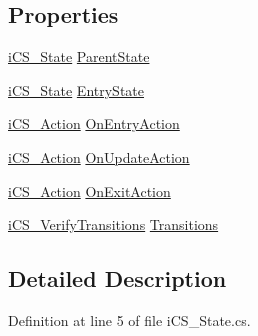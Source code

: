 \subsection*{Properties}
\begin{DoxyCompactItemize}
\item 
\hyperlink{classi_c_s___state}{i\+C\+S\+\_\+\+State} \hyperlink{classi_c_s___state_a1e84880a51a962cc0bf11aa9edc6b720}{Parent\+State}
\item 
\hyperlink{classi_c_s___state}{i\+C\+S\+\_\+\+State} \hyperlink{classi_c_s___state_a7954d179eadef63d55e73a1713840297}{Entry\+State}
\item 
\hyperlink{classi_c_s___action}{i\+C\+S\+\_\+\+Action} \hyperlink{classi_c_s___state_aacb78c2d59d4d8476901ec77c4b1e48b}{On\+Entry\+Action}
\item 
\hyperlink{classi_c_s___action}{i\+C\+S\+\_\+\+Action} \hyperlink{classi_c_s___state_a4a7301fd28e4a897dbfce6d35211fc09}{On\+Update\+Action}
\item 
\hyperlink{classi_c_s___action}{i\+C\+S\+\_\+\+Action} \hyperlink{classi_c_s___state_a8aa00d9dbdea3e0be989957780b2fc2e}{On\+Exit\+Action}
\item 
\hyperlink{classi_c_s___verify_transitions}{i\+C\+S\+\_\+\+Verify\+Transitions} \hyperlink{classi_c_s___state_acab635f65159bc3b57776e6198382c9e}{Transitions}
\end{DoxyCompactItemize}


\subsection{Detailed Description}


Definition at line 5 of file i\+C\+S\+\_\+\+State.\+cs.



